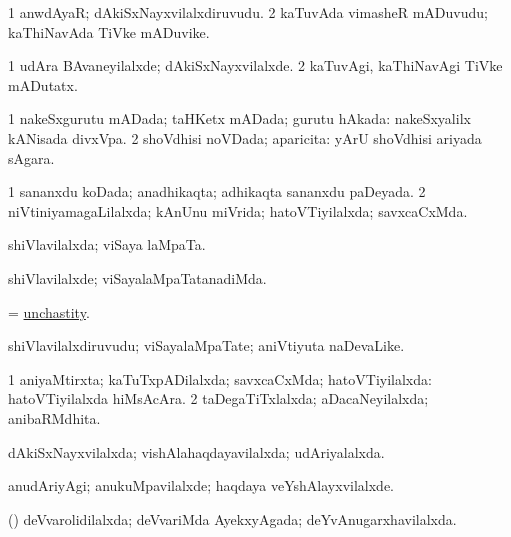 \bentry
{} 
\gl{\nA}
\expl{}
\bmng
\bnum
\num{1} anwdAyaR; dAkiSxNayxvilalxdiruvudu. 
\num{2} kaTuvAda vimasheR mADuvudu; kaThiNavAda TiVke mADuvike. 
\enum
\emng
\eentry

\bentry
{} 
\gl{\kirxvi}
\expl{}
\bmng
\bnum
\num{1} udAra BAvaneyilalxde; dAkiSxNayxvilalxde. 
\num{2} kaTuvAgi, kaThiNavAgi TiVke mADutatx. 
\enum
\emng
\eentry

\bentry
{} 
\gl{\gu}
\expl{}
\bmng
\bnum
\num{1} nakeSxgurutu mADada; taHKetx mADada; gurutu hAkada:  nakeSxyalilx kANisada divxVpa. 
\num{2} shoVdhisi noVDada; aparicita:  yArU shoVdhisi ariyada sAgara. 
\enum
\emng
\eentry

\bentry
{} 
\gl{\gu}
\expl{}
\bmng
\bnum
\num{1} sananxdu koDada; anadhikaqta; adhikaqta sananxdu paDeyada. 
\num{2} niVtiniyamagaLilalxda; kAnUnu miVrida; hatoVTiyilalxda; savxcaCxMda. 
\enum
\emng
\eentry

\bentry
{} 
\gl{\gu}
\expl{}
\bmng
shiVlavilalxda; viSaya laMpaTa. 
\emng
\eentry

\bentry
{} 
\gl{\kirxvi}
\expl{}
\bmng
shiVlavilalxde; viSayalaMpaTatanadiMda. 
\emng
\eentry

\bentry
{} 
\gl{\nA}
\expl{}
\bmng
= \hyperlink{unchastity}{unchastity}. 
\emng
\eentry

\bentry
{} 
\gl{\nA}
\expl{}
\bmng
shiVlavilalxdiruvudu; viSayalaMpaTate; aniVtiyuta naDevaLike. 
\emng
\eentry

\bentry
{} 
\gl{\gu}
\expl{}
\bmng
\bnum
\num{1} aniyaMtirxta; kaTuTxpADilalxda; savxcaCxMda; hatoVTiyilalxda:  hatoVTiyilalxda hiMsAcAra. 
\num{2} taDegaTiTxlalxda; aDacaNeyilalxda; anibaRMdhita. 
\enum
\emng
\eentry

\bentry
{} 
\gl{\gu}
\expl{}
\bmng
dAkiSxNayxvilalxda; vishAlahaqdayavilalxda; udAriyalalxda. 
\emng
\eentry

\bentry
{} 
\gl{\kirxvi}
\expl{}
\bmng
anudAriyAgi; anukuMpavilalxde; haqdaya veYshAlayxvilalxde. 
\emng
\eentry

\bentry
{} 
\gl{\gu}
\expl{}
\bmng
(\deVva) deVvarolidilalxda; deVvariMda AyekxyAgada; deYvAnugarxhavilalxda. 
\emng
\eentry

